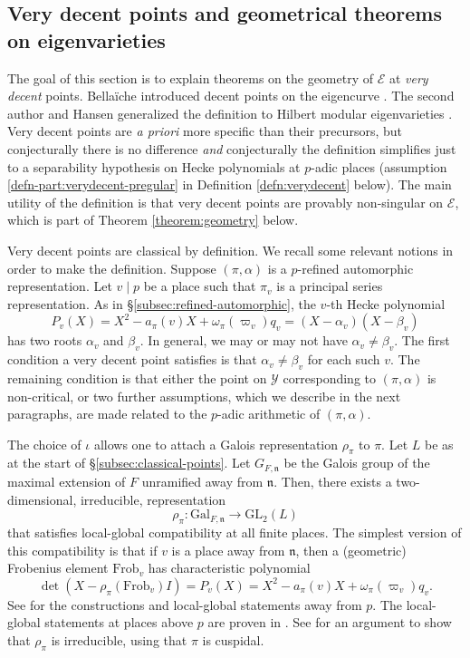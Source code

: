 \documentclass[10pt, twoside]{amsart}
\theoremstyle{plain}
\theoremstyle{definition}
\theoremstyle{remark}
\numberwithin{equation}{subsection}
\def\GL{\mathrm{GL}}
\def\Gal{\mathrm{Gal}}
\def\gn{\mathfrak n}
\def\scre{\mathscr E}
\def\scry{\mathscr Y}
\def\Frob{\mathrm{Frob}}
\begin{document}
\subsection{Very decent points and geometrical theorems on eigenvarieties}\label{subsection:eigenvariety-geometry}
The goal of this section is to explain theorems on the geometry of $\scre$ at {\em very decent} points.  Bella\"iche introduced decent points on the eigencurve \cite{Bel-Critical}. The second author and Hansen generalized the definition to Hilbert modular eigenvarieties \cite{BH}. Very decent points are  {\em a priori} more specific than their precursors, but conjecturally there is no difference {\em and} conjecturally the definition simplifies just to a separability hypothesis on Hecke polynomials at $p$-adic places (assumption \ref{defn-part:verydecent-pregular} in Definition \ref{defn:verydecent} below). The main utility of the definition is that very decent points are provably non-singular on $\scre$, which is part of Theorem \ref{theorem:geometry} below. 

Very decent points are classical by definition. We recall some relevant notions in order to make the definition. Suppose $(\pi,\alpha)$ is a $p$-refined automorphic representation. Let $v \mid p$ be a place such that $\pi_v$ is a principal series representation. As in \S \ref{subsec:refined-automorphic},  the $v$-th Hecke polynomial
$$
P_v(X) = X^2 - a_\pi(v)X + \omega_\pi(\varpi_v)q_v = (X-\alpha_v)(X-\beta_v)
$$
has two roots $\alpha_v$ and $\beta_v$. In general, we may or may not have $\alpha_v\neq \beta_v$. The first condition a very decent point satisfies is that $\alpha_v \neq \beta_v$ for each such $v$. The remaining condition is that either the point on $\scry$ corresponding to $(\pi,\alpha)$ is non-critical, or two further assumptions, which we describe in the next paragraphs, are made related to the $p$-adic arithmetic of $(\pi,\alpha)$.

The choice of $\iota$ allows one to attach a Galois representation $\rho_\pi$ to $\pi$. Let $L$ be as at the start of \S \ref{subsec:classical-points}. Let $G_{F,\gn}$ be the Galois group of the maximal extension of $F$ unramified away from $\gn$. Then, there exists a two-dimensional, irreducible, representation
$$
\rho_\pi : \Gal_{F,\gn} \longrightarrow \GL_2(L)
$$
that satisfies local-global compatibility at all finite places. The simplest version of this compatibility is that if $v$ is a place away from $\gn$, then a (geometric) Frobenius element $\Frob_v$ has characteristic polynomial
$$
\det(X - \rho_\pi(\Frob_v)I) = P_v(X) = X^2 - a_\pi(v)X + \omega_{\pi}(\varpi_v)q_v.
$$
See \cite{Carayol, Wiles, BR,Taylor-HMF}  for the constructions and local-global statements away from $p$. The local-global statements at places above $p$ are proven in \cite{BR,Saito1,Saito2,Skinner}. See \cite[page 256]{Skinner} for an argument to show that $\rho_{\pi}$ is irreducible, using that $\pi$ is cuspidal. 
\end{document}

